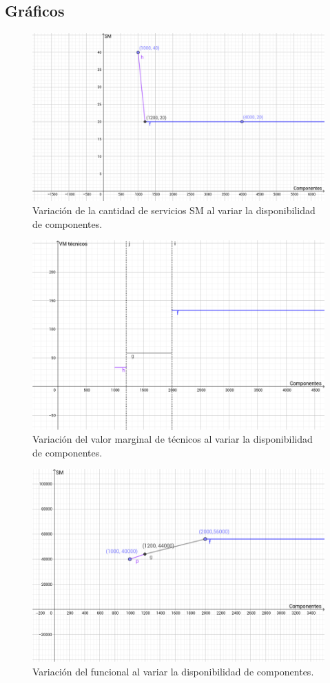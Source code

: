 \documentclass{article}
\begin{document}
\begin{enumerate}
		\section{Gr\'aficos}
		\begin{figure}[H]
			\caption{Variaci\'on de la cantidad de servicios SM al variar la disponibilidad de componentes.}
			\includegraphics[scale=0.35]{SM.png}
		\end{figure}
		\smallskip
		\begin{figure}[H]
			\caption{Variaci\'on del valor marginal de t\'ecnicos al variar la disponibilidad de componentes.}
			\includegraphics[scale=0.35]{tecncosvm.png}
		\end{figure}
		\smallskip
		\begin{figure}[H]
			\caption{Variaci\'on del funcional al variar la disponibilidad de componentes.}
			\includegraphics[scale=0.35]{funcional.png}

\end{figure}
\end{enumerate}
\end{document}
